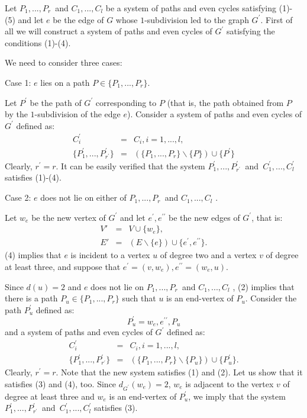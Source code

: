 \documentclass[fleqn,12pt,twoside]{article}
\newenvironment{proof}[1][Proof.]{\begin{trivlist}
\item[\hskip \labelsep {\bfseries #1}]}{\end{trivlist}}
\begin{document}
\begin{proof}
Let $P_{1},...,P_{r}$\textit{\ }and $C_{1},...,C_{l}$ be a system of
paths
and even cycles satisfying (1)-(5) and let $e$ be the edge of $G$ whose $1$-subdivision led to the graph $G^{\prime }$. First of all we will
construct a system of paths and even cycles of $G^{\prime }$
satisfying the conditions (1)-(4).

We need to consider three cases:

Case 1: $e$ lies on a path $P\in \{P_{1},...,P_{r}\}$.

Let $P^{\prime }$ be the path of $G^{\prime }$ corresponding to $P$
(that is, the path obtained from $P$ by the $1$-subdivision of the
edge $e$). Consider a system of paths and even cycles of $G^{\prime
}$ defined as:
\begin{eqnarray*}
C_{i}^{\prime } &=&C_{i},i=1,...,l, \\
\{P_{1}^{\prime },...,P_{r^{\prime }}^{\prime }\}
&=&(\{P_{1},...,P_{r}\}\backslash \{P\})\cup \{P^{\prime }\}
\end{eqnarray*}
Clearly, $r^{\prime }=r$. It can be easily verified that the system $P_{1}^{\prime },...,P_{r^{\prime }}^{\prime }$\textit{\ }and\textit{\ }$C_{1}^{\prime },...,C_{l}^{\prime }$ satisfies (1)-(4).

Case 2: $e$ does not lie on either of $P_{1},...,P_{r}$\textit{\ }and $C_{1},...,C_{l}$ .

Let $w_{e}$ be the new vertex of $G^{\prime }$ and let $e^{\prime
},e^{\prime \prime }$ be the new edges of $G^{\prime }$, that is:
\begin{eqnarray*}
V' &=&V\cup \{w_{e}\}, \\
E' &=&(E\backslash \{e\})\cup \{e^{\prime },e^{\prime \prime }\}.
\end{eqnarray*}
(4) implies that $e$ is incident to a vertex $u$ of degree two and a vertex $v$ of degree at least three, and suppose that $e^{\prime
}=(v,w_{e}),e^{\prime \prime }=(w_{e},u)$.\newline

Since $d(u)=2$ and $e$ does not lie on $P_{1},...,P_{r}$\textit{\ }and $C_{1},...,C_{l}$ , (2) implies that there is a path $P_{u}\in
\{P_{1},...,P_{r}\}$ such that $u$ is an end-vertex of $P_{u}$.
Consider the path $P_{u}^{\prime }$ defined as:
\begin{equation*}
P_{u}^{\prime }=w_{e},e^{\prime \prime },P_{u}
\end{equation*}and a system of paths and even cycles of $G^{\prime }$ defined as:
\begin{eqnarray*}
C_{i}^{\prime } &=&C_{i},i=1,...,l, \\
\{P_{1}^{\prime },...,P_{r^{\prime }}^{\prime }\}
&=&(\{P_{1},...,P_{r}\}\backslash \{P_{u}\})\cup \{P_{u}^{\prime
}\}.
\end{eqnarray*}Clearly, $r^{\prime }=r$. Note that the new system satisfies (1) and
(2). Let us show that it satisfies (3) and (4), too. Since
$d_{G^{\prime }}(w_{e})=2$, $w_{e}$ is adjacent to the vertex $v$ of
degree at least three
and $w_{e}$ is an end-vertex of $P_{u}^{\prime }$, we imply that the system $P_{1}^{\prime },...,P_{r^{\prime }}^{\prime }$\textit{\ }and\textit{\ }$C_{1}^{\prime },...,C_{l}^{\prime }$ satisfies (3).


\end{proof}
\end{document}
